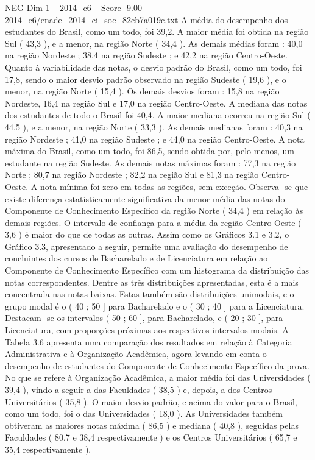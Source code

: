 \begin{textsample}{NEG Dim 1 – 2014\_c6 – Score -9.00 – 2014\_c6/enade\_2014\_ci\_soc\_82cb7a019c.txt}
A média do desempenho dos estudantes do Brasil, como um todo, foi 39,2.
A maior média foi obtida na região Sul ( 43,3 ), e a menor, na região Norte ( 34,4 ).
As demais médias foram : 40,0 na região Nordeste ; 38,4 na região Sudeste ; e 42,2 na região Centro-Oeste.
Quanto à variabilidade das notas, o desvio padrão do Brasil, como um todo, foi 17,8, sendo o maior desvio padrão observado na região Sudeste ( 19,6 ), e o menor, na região Norte ( 15,4 ).
Os demais desvios foram : 15,8 na região Nordeste, 16,4 na região Sul e 17,0 na região Centro-Oeste.
A mediana das notas dos estudantes de todo o Brasil foi 40,4.
A maior mediana ocorreu na região Sul ( 44,5 ), e a menor, na região Norte ( 33,3 ).
As demais medianas foram : 40,3 na região Nordeste ; 41,0 na região Sudeste ; e 44,0 na região Centro-Oeste.
A nota máxima do Brasil, como um todo, foi 86,5, sendo obtida por, pelo menos, um estudante na região Sudeste.
As demais notas máximas foram : 77,3 na região Norte ; 80,7 na região Nordeste ; 82,2 na região Sul e 81,3 na região Centro-Oeste.
A nota mínima foi zero em todas as regiões, sem exceção.
Observa -se que existe diferença estatisticamente significativa da menor média das notas do Componente de Conhecimento Específico da região Norte ( 34,4 ) em relação às demais regiões.
O intervalo de confiança para a média da região Centro-Oeste ( 3,6 ) é maior do que de todas as outras.
Assim como os Gráficos 3.1 e 3.2, o Gráfico 3.3, apresentado a seguir, permite uma avaliação do desempenho de concluintes dos cursos de Bacharelado e de Licenciatura em relação ao Componente de Conhecimento Específico com um histograma da distribuição das notas correspondentes.
Dentre as três distribuições apresentadas, esta é a mais concentrada nas notas baixas.
Estas também são distribuições unimodais, e o grupo modal é o ( 40 ; 50 ] para Bacharelado e o ( 30 ; 40 ] para a Licenciatura.
Destacam -se os intervalos ( 50 ; 60 ], para Bacharelado, e ( 20 ; 30 ], para Licenciatura, com proporções próximas aos respectivos intervalos modais.
A Tabela 3.6 apresenta uma comparação dos resultados em relação à Categoria Administrativa e à Organização Acadêmica, agora levando em conta o desempenho de estudantes do Componente de Conhecimento Específico da prova.
No que se refere à Organização Acadêmica, a maior média foi das Universidades ( 39,4 ), vindo a seguir a das Faculdades ( 38,5 ) e, depois, a dos Centros Universitários ( 35,8 ).
O maior desvio padrão, e acima do valor para o Brasil, como um todo, foi o das Universidades ( 18,0 ).
As Universidades também obtiveram as maiores notas máxima ( 86,5 ) e mediana ( 40,8 ), seguidas pelas Faculdades ( 80,7 e 38,4 respectivamente ) e os Centros Universitários ( 65,7 e 35,4 respectivamente ).

\end{textsample}
